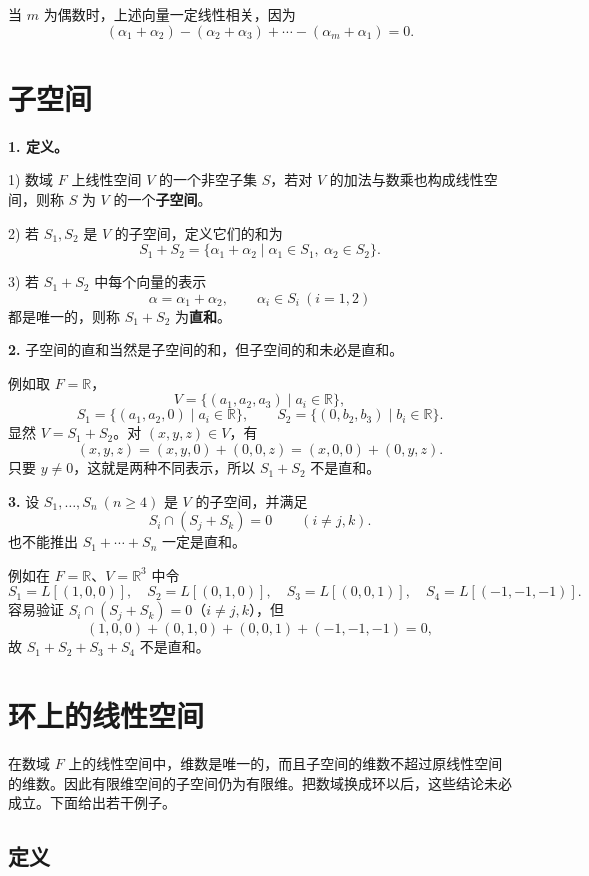 当 $m$ 为偶数时，上述向量一定线性相关，因为
\[
(\alpha_1+\alpha_2)-(\alpha_2+\alpha_3)+\cdots-(\alpha_m+\alpha_1)=0.
\]

\section{子空间}

\textbf{1. 定义。}

1) 数域 $F$ 上线性空间 $V$ 的一个非空子集 $S$，若对 $V$ 的加法与数乘也构成线性空间，则称 $S$ 为 $V$ 的一个\textbf{子空间}。

2) 若 $S_1,S_2$ 是 $V$ 的子空间，定义它们的和为
\[
S_1+S_2=\{\alpha_1+\alpha_2\mid \alpha_1\in S_1,\ \alpha_2\in S_2\}.
\]

3) 若 $S_1+S_2$ 中每个向量的表示
\[
\alpha=\alpha_1+\alpha_2,
\qquad \alpha_i\in S_i\ (i=1,2)
\]
都是唯一的，则称 $S_1+S_2$ 为\textbf{直和}。

\textbf{2.} 子空间的直和当然是子空间的和，但子空间的和未必是直和。

例如取 $F=\mathbb R$，
\[
V=\{(a_1,a_2,a_3)\mid a_i\in\mathbb R\},
\]
\[
S_1=\{(a_1,a_2,0)\mid a_i\in\mathbb R\},
\qquad
S_2=\{(0,b_2,b_3)\mid b_i\in\mathbb R\}.
\]
显然 $V=S_1+S_2$。对 $(x,y,z)\in V$，有
\[
(x,y,z)=(x,y,0)+(0,0,z)
       =(x,0,0)+(0,y,z).
\]
只要 $y\ne0$，这就是两种不同表示，所以 $S_1+S_2$ 不是直和。

\textbf{3.} 设 $S_1,\ldots,S_n\ (n\ge4)$ 是 $V$ 的子空间，并满足
\[
S_i\cap(S_j+S_k)=0\qquad(i\ne j,k).
\]
也不能推出 $S_1+\cdots+S_n$ 一定是直和。

例如在 $F=\mathbb R$、$V=\mathbb R^3$ 中令
\[
S_1=L[(1,0,0)],\quad
S_2=L[(0,1,0)],\quad
S_3=L[(0,0,1)],\quad
S_4=L[(-1,-1,-1)].
\]
容易验证 $S_i\cap(S_j+S_k)=0$（$i\ne j,k$），但
\[
(1,0,0)+(0,1,0)+(0,0,1)+(-1,-1,-1)=0,
\]
故 $S_1+S_2+S_3+S_4$ 不是直和。

\section{环上的线性空间}

在数域 $F$ 上的线性空间中，维数是唯一的，而且子空间的维数不超过原线性空间的维数。因此有限维空间的子空间仍为有限维。把数域换成环以后，这些结论未必成立。下面给出若干例子。

\subsection{定义}

